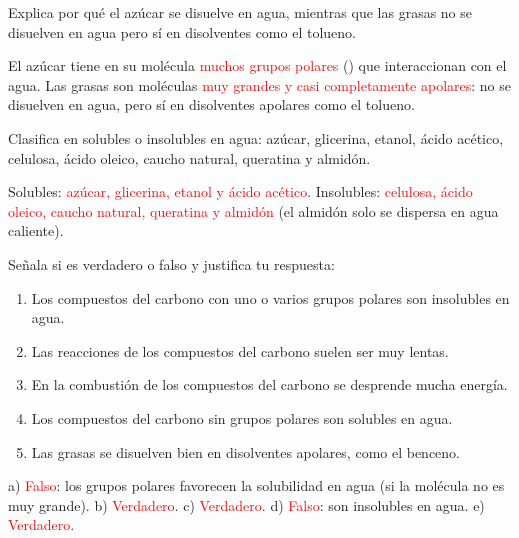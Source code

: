 \begin{exercise}
    Explica por qué el azúcar se disuelve en agua, mientras que las grasas no se disuelven en agua pero sí en disolventes como el tolueno.
    \begin{solu}
        El azúcar tiene en su molécula \textcolor{red}{muchos grupos polares} () que interaccionan con el agua. Las grasas son moléculas \textcolor{red}{muy grandes y casi completamente apolares}: no se disuelven en agua, pero sí en disolventes apolares como el tolueno.
    \end{solu}
\end{exercise}

\begin{exercise}
    Clasifica en solubles o insolubles en agua: azúcar, glicerina, etanol, ácido acético, celulosa, ácido oleico, caucho natural, queratina y almidón.
    \begin{solu}
        Solubles: \textcolor{red}{azúcar, glicerina, etanol y ácido acético}. Insolubles: \textcolor{red}{celulosa, ácido oleico, caucho natural, queratina y almidón} (el almidón solo se dispersa en agua caliente).
    \end{solu}
\end{exercise}

\begin{exercise}
    Señala si es verdadero o falso y justifica tu respuesta:
    \begin{enumerate}[label=\alph*)]
        \item Los compuestos del carbono con uno o varios grupos polares son insolubles en agua.
        \item Las reacciones de los compuestos del carbono suelen ser muy lentas.
        \item En la combustión de los compuestos del carbono se desprende mucha energía.
        \item Los compuestos del carbono sin grupos polares son solubles en agua.
        \item Las grasas se disuelven bien en disolventes apolares, como el benceno.
    \end{enumerate}
    \begin{solu}
        a) \textcolor{red}{Falso}: los grupos polares favorecen la solubilidad en agua (si la molécula no es muy grande). b) \textcolor{red}{Verdadero}. c) \textcolor{red}{Verdadero}. d) \textcolor{red}{Falso}: son insolubles en agua. e) \textcolor{red}{Verdadero}.
    \end{solu}
\end{exercise}

